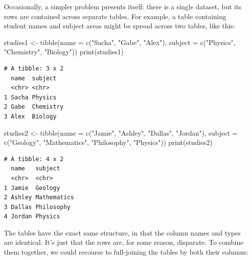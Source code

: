 \documentclass[
  letterpaper,
  DIV=11,
  numbers=noendperiod]{scrreprt}
\newenvironment{Shaded}{\begin{snugshade}}{\end{snugshade}}
\newcommand{\AttributeTok}[1]{\textcolor[rgb]{0.40,0.45,0.13}{#1}}
\newcommand{\FunctionTok}[1]{\textcolor[rgb]{0.28,0.35,0.67}{#1}}
\newcommand{\NormalTok}[1]{\textcolor[rgb]{0.00,0.23,0.31}{#1}}
\newcommand{\OtherTok}[1]{\textcolor[rgb]{0.00,0.23,0.31}{#1}}
\newcommand{\StringTok}[1]{\textcolor[rgb]{0.13,0.47,0.30}{#1}}
\begin{document}
Occasionally, a simpler problem presents itself: there is a single
dataset, but its rows are contained across separate tables. For example,
a table containing student names and subject areas might be spread
across two tables, like this:

\begin{Shaded}
\begin{Highlighting}[]
\NormalTok{studies1 }\OtherTok{\textless{}{-}} \FunctionTok{tibble}\NormalTok{(}\AttributeTok{name    =} \FunctionTok{c}\NormalTok{(}\StringTok{"Sacha"}\NormalTok{, }\StringTok{"Gabe"}\NormalTok{, }\StringTok{"Alex"}\NormalTok{),}
                   \AttributeTok{subject =} \FunctionTok{c}\NormalTok{(}\StringTok{"Physics"}\NormalTok{, }\StringTok{"Chemistry"}\NormalTok{, }\StringTok{"Biology"}\NormalTok{))}
\FunctionTok{print}\NormalTok{(studies1)}
\end{Highlighting}
\end{Shaded}

\begin{verbatim}
# A tibble: 3 x 2
  name  subject  
  <chr> <chr>    
1 Sacha Physics  
2 Gabe  Chemistry
3 Alex  Biology  
\end{verbatim}

\begin{Shaded}
\begin{Highlighting}[]
\NormalTok{studies2 }\OtherTok{\textless{}{-}} \FunctionTok{tibble}\NormalTok{(}\AttributeTok{name    =} \FunctionTok{c}\NormalTok{(}\StringTok{"Jamie"}\NormalTok{, }\StringTok{"Ashley"}\NormalTok{, }\StringTok{"Dallas"}\NormalTok{, }\StringTok{"Jordan"}\NormalTok{),}
                   \AttributeTok{subject =} \FunctionTok{c}\NormalTok{(}\StringTok{"Geology"}\NormalTok{, }\StringTok{"Mathematics"}\NormalTok{, }\StringTok{"Philosophy"}\NormalTok{, }\StringTok{"Physics"}\NormalTok{))}
\FunctionTok{print}\NormalTok{(studies2)}
\end{Highlighting}
\end{Shaded}

\begin{verbatim}
# A tibble: 4 x 2
  name   subject    
  <chr>  <chr>      
1 Jamie  Geology    
2 Ashley Mathematics
3 Dallas Philosophy 
4 Jordan Physics    
\end{verbatim}

The tables have the exact same structure, in that the column names and
types are identical. It's just that the rows are, for some reason,
disparate. To combine them together, we could recourse to full-joining
the tables by both their columns:
\end{document}
